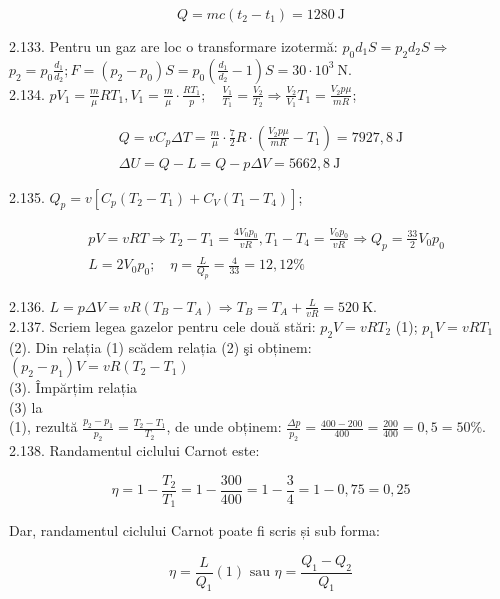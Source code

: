 $$
Q=m c\left(t_{2}-t_{1}\right)=1280 \mathrm{~J}
$$

2.133. Pentru un gaz are loc o transformare izotermă: $p_{0} d_{1} S=p_{2} d_{2} S \Rightarrow$ $p_{2}=p_{0} \frac{d_{1}}{d_{2}} ; F=\left(p_{2}-p_{0}\right) S=p_{0}\left(\frac{d_{1}}{d_{2}}-1\right) S=30 \cdot 10^{3} \mathrm{~N}$.\\
2.134. $p V_{1}=\frac{m}{\mu} R T_{1}, V_{1}=\frac{m}{\mu} \cdot \frac{R T_{1}}{p} ; \quad \frac{V_{1}}{T_{1}}=\frac{V_{2}}{T_{2}} \Rightarrow \frac{V_{2}}{V_{1}} T_{1}=\frac{V_{2} p \mu}{m R}$;

$$
\begin{gathered}
Q=v C_{p} \Delta T=\frac{m}{\mu} \cdot \frac{7}{2} R \cdot\left(\frac{V_{2} p \mu}{m R}-T_{1}\right)=7927,8 \mathrm{~J} \\
\Delta U=Q-L=Q-p \Delta V=5662,8 \mathrm{~J}
\end{gathered}
$$

2.135. $Q_{p}=v\left[C_{p}\left(T_{2}-T_{1}\right)+C_{V}\left(T_{1}-T_{4}\right)\right]$;

$$
\begin{aligned}
& p V=v R T \Rightarrow T_{2}-T_{1}=\frac{4 V_{0} p_{0}}{v R}, T_{1}-T_{4}=\frac{V_{0} p_{0}}{v R} \Rightarrow Q_{p}=\frac{33}{2} V_{0} p_{0} \\
& L=2 V_{0} p_{0} ; \quad \eta=\frac{L}{Q_{p}}=\frac{4}{33}=12,12 \%
\end{aligned}
$$

2.136. $L=p \Delta V=v R\left(T_{B}-T_{A}\right) \Rightarrow T_{B}=T_{A}+\frac{L}{v R}=520 \mathrm{~K}$.\\
2.137. Scriem legea gazelor pentru cele două stări: $p_{2} V=v R T_{2}$ (1); $p_{1} V=v R T_{1}$ (2). Din relația (1) scădem relația (2) şi obținem:\\
$\left(p_{2}-p_{1}\right) V=v R\left(T_{2}-T_{1}\right)$\\
(3). Împărțim relația\\
(3) la\\
(1), rezultă $\frac{p_{2}-p_{1}}{p_{2}}=\frac{T_{2}-T_{1}}{T_{2}}$, de unde obținem: $\frac{\Delta p}{p_{2}}=\frac{400-200}{400}=\frac{200}{400}=0,5=50 \%$.\\
2.138. Randamentul ciclului Carnot este:

$$
\eta=1-\frac{T_{2}}{T_{1}}=1-\frac{300}{400}=1-\frac{3}{4}=1-0,75=0,25
$$

Dar, randamentul ciclului Carnot poate fi scris și sub forma:


\begin{equation*}
\eta=\frac{L}{Q_{1}}(1) \text { sau } \eta=\frac{Q_{1}-Q_{2}}{Q_{1}} \tag{2}
\end{equation*}


